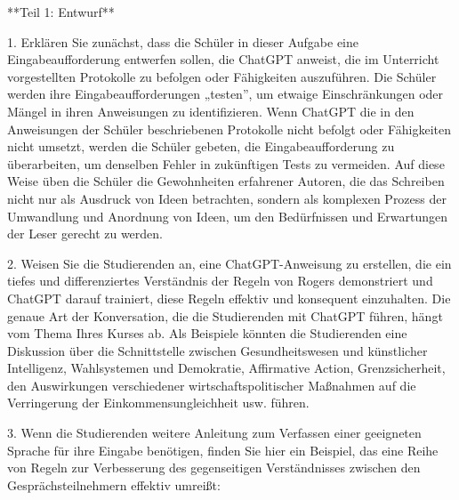 \documentclass[
  ngerman,
  letterpaper,
  DIV=11]{scrreprt}
\newenvironment{Shaded}{\begin{snugshade}}{\end{snugshade}}
\newcommand{\NormalTok}[1]{\textcolor[rgb]{0.00,0.23,0.31}{#1}}
\newcommand{\SpecialStringTok}[1]{\textcolor[rgb]{0.13,0.47,0.30}{#1}}
\begin{document}
\begin{tcolorbox}
\begin{Shaded}
\begin{Highlighting}[]
\NormalTok{**Teil 1: Entwurf**}

\SpecialStringTok{1.  }\NormalTok{Erklären Sie zunächst, dass die Schüler in dieser Aufgabe eine Eingabeaufforderung entwerfen sollen, die ChatGPT anweist, die im Unterricht vorgestellten Protokolle zu befolgen oder Fähigkeiten auszuführen. Die Schüler werden ihre Eingabeaufforderungen „testen”, um etwaige Einschränkungen oder Mängel in ihren Anweisungen zu identifizieren. Wenn ChatGPT die in den Anweisungen der Schüler beschriebenen Protokolle nicht befolgt oder Fähigkeiten nicht umsetzt, werden die Schüler gebeten, die Eingabeaufforderung zu überarbeiten, um denselben Fehler in zukünftigen Tests zu vermeiden. Auf diese Weise üben die Schüler die Gewohnheiten erfahrener Autoren, die das Schreiben nicht nur als Ausdruck von Ideen betrachten, sondern als komplexen Prozess der Umwandlung und Anordnung von Ideen, um den Bedürfnissen und Erwartungen der Leser gerecht zu werden.}

\SpecialStringTok{2.  }\NormalTok{Weisen Sie die Studierenden an, eine ChatGPT{-}Anweisung zu erstellen, die ein tiefes und differenziertes Verständnis der Regeln von Rogers demonstriert und ChatGPT darauf trainiert, diese Regeln effektiv und konsequent einzuhalten. Die genaue Art der Konversation, die die Studierenden mit ChatGPT führen, hängt vom Thema Ihres Kurses ab. Als Beispiele könnten die Studierenden eine Diskussion über die Schnittstelle zwischen Gesundheitswesen und künstlicher Intelligenz, Wahlsystemen und Demokratie, Affirmative Action, Grenzsicherheit, den Auswirkungen verschiedener wirtschaftspolitischer Maßnahmen auf die Verringerung der Einkommensungleichheit usw. führen.}

\SpecialStringTok{3.  }\NormalTok{Wenn die Studierenden weitere Anleitung zum Verfassen einer geeigneten Sprache für ihre Eingabe benötigen, finden Sie hier ein Beispiel, das eine Reihe von Regeln zur Verbesserung des gegenseitigen Verständnisses zwischen den Gesprächsteilnehmern effektiv umreißt:}


\end{Highlighting}
\end{Shaded}
\end{tcolorbox}
\end{document}
